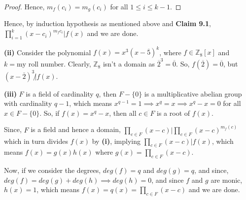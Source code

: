 \documentclass[12pt,a4paper]{article}
\theoremstyle{definition}
\begin{document}
\begin{flushleft}
\begin{proof}
	Hence, $m_f(c_i) = m_g(c_i)$ for all $1\le i \le k-1$.
\end{proof}

Hence, by induction hypothesis as mentioned above and {\bf Claim 9.1}, $\prod_{i = 1}^{k} (x-c_i)^{m_f{c_i}} | f(x)$ and we are done.

\newpage

{\bf (ii)} Consider the polynomial $f(x) = x^3(x-\overline{5})^k$, where $f \in \mathbb{Z}_8[x]$ and $k = \text{my roll number}$. Clearly, $\mathbb{Z}_8$ isn't a domain as $\overline{2}^3 = \overline{0}$. So, $f(\overline{2}) = \overline{0} $, but $(x-\overline{2})^3 \not| f(x)$.

\bigskip

{\bf (iii)} $F$ is a field of cardinality $q$, then $F-\{0\}$ is a multiplicative abelian group with cardinality $q-1$, which means $x^{q-1} = 1 \implies x^q = x \implies x^q-x = 0$ for all $x \in F-\{0\}$. So, if $f(x) = x^q - x$, then all $c \in F$ is a root of $f(x)$.

\medskip

Since, $F$ is a field and hence a domain, $\prod_{c \in F} (x-c) | \prod_{c \in F} (x-c)^{m_f(c)}$ which in turn divides $f(x)$ by {\bf (i)}, implying $\prod_{c \in F} (x-c) |f(x)$, which means $f(x) = g(x)h(x)$ where $g(x) = \prod_{c \in F} (x-c)$.

\medskip

Now, if we consider the degrees, $deg(f) = q$ and $deg(g) = q$, and  since, $deg(f) = deg(g) + deg(h) \implies deg(h) = 0$, and since $f$ and $g$ are monic, $h(x) = 1$, which means $f(x) = q(x) = \prod_{c \in F} (x-c)$ and we are done.


\end{flushleft}
\end{document}

